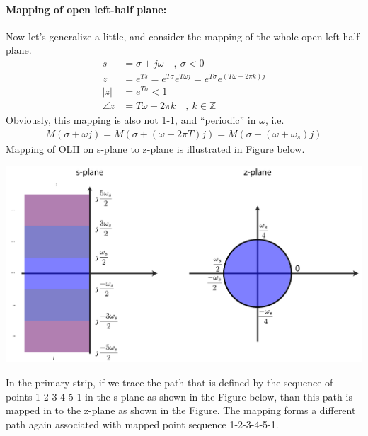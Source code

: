 \documentclass[twoside]{article}
\begin{document}
\paragraph{Mapping of open left-half plane:} 
%
Now let's generalize a little, and consider the mapping of the whole
open left-half plane.
%
\begin{align*}
s &= \sigma + j \omega \quad , \ \sigma < 0\\
z &= e^{Ts} = e^{T \sigma} e^{T \omega j} =  e^{T \sigma} e^{(T \omega
    + 2\pi k )j } \\
| z | &= e^{T \sigma} < 1 \\ 
\angle z &= T \omega + 2 \pi k  \quad , \ k \in \mathbb{Z}
\end{align*}
%
Obviously, this mapping is also not 1-1, and ``periodic'' in $\omega$, i.e.
\begin{align*}
  M(\sigma + \omega j ) = M (\sigma +  (\omega + 2\pi T) j ) =  M ( \sigma
  + (\omega + \omega_s) j )
\end{align*}
%
Mapping of OLH on s-plane to z-plane is illustrated in Figure below. 
%
    \begin{center}
\begin{minipage}[h]{0.85\linewidth}
    \begin{center}
      \includegraphics[width=\textwidth]{olh}
    \end{center}
\end{minipage}
    \end{center}
%
In the primary strip, if we trace the path that is defined by the
sequence of points 1-2-3-4-5-1 in the s plane as shown in the 
Figure below, than this path is mapped in to the z-plane as shown
in the Figure. The mapping forms a different path again associated
with mapped point sequence 1-2-3-4-5-1. 
%
\end{document}
